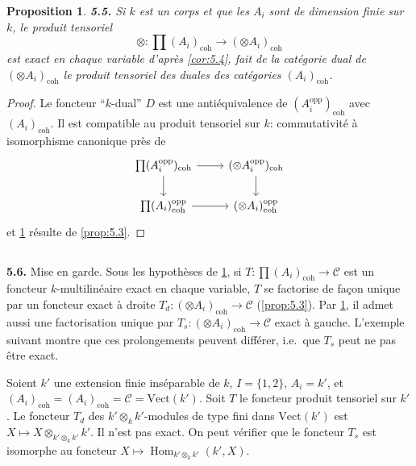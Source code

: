 \documentclass[12pt,a4paper]{article}
\theoremstyle{plain}
\newtheorem{proposition}[theorem]{Proposition}
\theoremstyle{definition}
\theoremstyle{remark}
\DeclareMathOperator{\Hom}{Hom}
\begin{document}
\begin{proposition}\label{prop:5.5}
\textbf{5.5.} Si $k$ est un corps et que les $A_i$ sont de dimension finie sur $k$, le produit tensoriel
\[
\otimes : \prod (A_i)_\mathrm{coh} \to (\otimes A_i)_\mathrm{coh}
\]
est exact en chaque variable d'après \ref{cor:5.4}, fait de la catégorie dual de $(\otimes A_i)_\mathrm{coh}$ le produit tensoriel des duales des catégories $(A_i)_\mathrm{coh}$.
\end{proposition}

\begin{proof}
Le foncteur ``$k$-dual'' $D$ est une antiéquivalence de $(A_i^\mathrm{opp})_\mathrm{coh}$ avec $(A_i)_\mathrm{coh}$. Il est compatible au produit tensoriel sur $k$: commutativité à isomorphisme canonique près de
\[
\begin{tikzcd}
\prod (A_i^\mathrm{opp})_\mathrm{coh} \arrow[r] \arrow[d] & (\otimes A_i^\mathrm{opp})_\mathrm{coh} \arrow[d] \\
\prod (A_i)_\mathrm{coh}^\mathrm{opp} \arrow[r] & (\otimes A_i)_\mathrm{coh}^\mathrm{opp}
\end{tikzcd}
\]
et \ref{prop:5.5} résulte de \ref{prop:5.3}.
\end{proof}

\subsection{}

\textbf{5.6.} Mise en garde. Sous les hypothèses de \ref{prop:5.5}, si $T : \prod (A_i)_\mathrm{coh} \to \mathcal{C}$ est un foncteur $k$-multilinéaire exact en chaque variable, $T$ se factorise de façon unique par un foncteur exact à droite $T_d : (\otimes A_i)_\mathrm{coh} \to \mathcal{C}$ (\ref{prop:5.3}). Par \ref{prop:5.5}, il admet aussi une factorisation unique par $T_s : (\otimes A_i)_\mathrm{coh} \to \mathcal{C}$ exact à gauche. L'exemple suivant montre que ces prolongements peuvent différer, i.e.~que $T_s$ peut ne pas être exact.

Soient $k'$ une extension finie inséparable de $k$, $I = \{1,2\}$, $A_i = k'$, et $(A_i)_\mathrm{coh} = (A_i)_\mathrm{coh} = \mathcal{C} = \mathrm{Vect}(k')$. Soit $T$ le foncteur produit tensoriel sur $k'$. Le foncteur $T_d$ des $k' \otimes_k k'$-modules de type fini dans $\mathrm{Vect}(k')$ est $X \mapsto X \otimes_{k' \otimes_k k'} k'$. Il n'est pas exact. On peut vérifier que le foncteur $T_s$ est isomorphe au foncteur $X \mapsto \Hom_{k' \otimes_k k'}(k', X)$.
\end{document}
